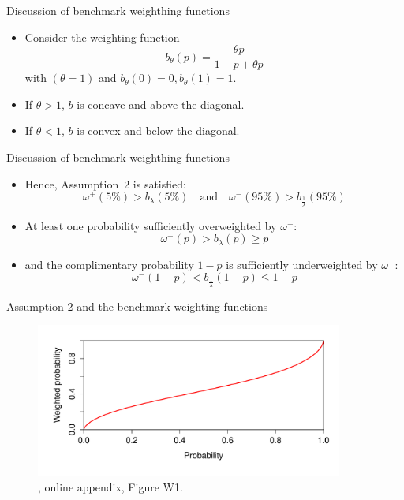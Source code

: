 \begin{frame}{Discussion of benchmark weighthing functions}
    \begin{itemize}
        \item Consider the weighting function \[b_\theta (p)=\frac{\theta p}{1-p+\theta p}\]
        with $(\theta=1)$ and $b_\theta(0)=0, b_\theta(1)=1$.\medskip
        \item If $\theta>1$, $b$ is concave and above the diagonal.\medskip
        \item If $\theta<1$, $b$ is convex and below the diagonal.\medskip
	\end{itemize}
\end{frame}



\begin{frame}{Discussion of benchmark weighthing functions}
    \begin{itemize}
        \item Hence, Assumption~2 is satisfied: \[\omega ^{+}(5\%)> b_\lambda(5\%) \quad \text{and} \quad \omega ^{-}(95\%)> b_\frac{1}{\lambda}(95\%)\]
        \item At least one probability sufficiently overweighted by $\omega^+$: \[\omega^+(p)>b_{\lambda}(p) \geq p\]
        \item and the complimentary probability $1-p$ is sufficiently underweighted by $\omega^- :$
        \[\omega^-(1-p) < b_{\frac{1}{\lambda}}(1-p) \leq 1-p\]
	\end{itemize}
\end{frame}

\begin{frame}{Assumption 2 and the benchmark weighting functions}
    \begin{figure}
        \centering
        \includegraphics[width = 0.9\textwidth]{decomposition_distortions1}
        \caption{\citet{EbertStrack2015}, online appendix, Figure W1.}
    \end{figure}
\end{frame}

